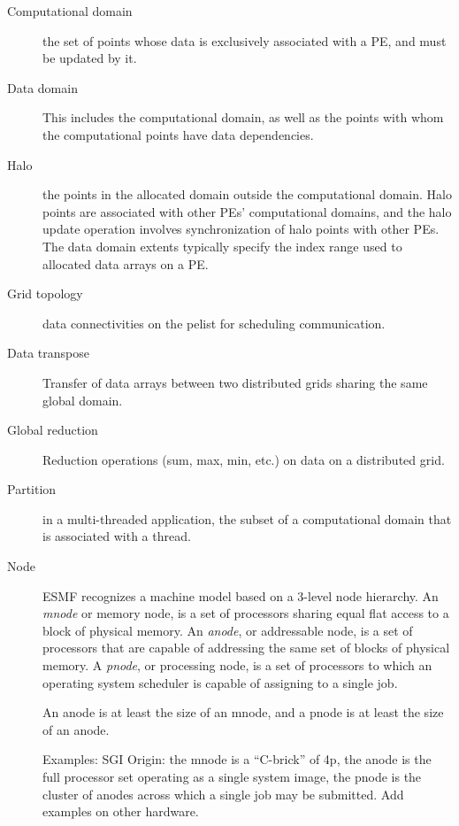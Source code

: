 \begin{description}
\item[Computational domain] the set of points whose data is
  exclusively associated with a PE, and must be updated by it.
\item[Data domain] This includes the computational domain, as well as the
  points with whom the computational points have data dependencies.
\item[Halo] the points in the allocated domain outside the
  computational domain. Halo points are associated with other PEs'
  computational domains, and the halo update operation involves
  synchronization of halo points with other PEs. The data domain
  extents typically specify the index range used to allocated data
  arrays on a PE.
\item[Grid topology] data connectivities on the pelist for scheduling
  communication.
\item[Data transpose] Transfer of data arrays between two distributed
  grids sharing the same global domain.
\item[Global reduction] Reduction operations (sum, max, min, etc.) on
  data on a distributed grid.
\item[Partition] in a multi-threaded application, the subset of a
  computational domain that is associated with a thread.
\item[Node] ESMF recognizes a machine model based on a 3-level node
  hierarchy. An \emph{mnode} or memory node, is a set of processors
  sharing equal flat access to a block of physical memory. An
  \emph{anode}, or addressable node, is a set of processors that are
  capable of addressing the same set of blocks of physical memory. A
  \emph{pnode}, or processing node, is a set of processors to which an
  operating system scheduler is capable of assigning to a single job.

  An anode is at least the size of an mnode, and a pnode is at least
  the size of an anode.
  
  Examples: SGI Origin: the mnode is a ``C-brick'' of 4p, the anode is
  the full processor set operating as a single system image, the pnode
  is the cluster of anodes across which a single job may be
  submitted. Add examples on other hardware.



\end{description}



